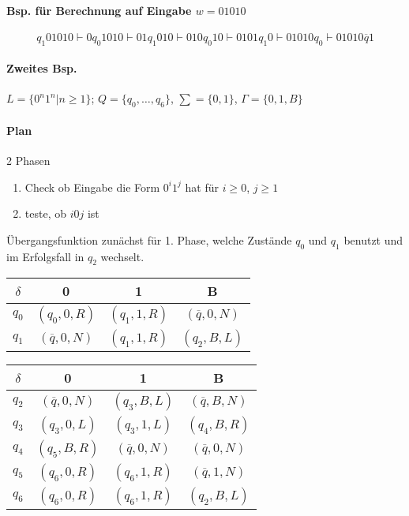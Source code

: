 \paragraph*{Bsp. für Berechnung auf Eingabe $w=01010$} $$q_1 01010 \vdash 0q_0 1010 \vdash 01q_1 010 \vdash 010q_0 10 \vdash 0101q_1 0 \vdash 01010q_0 \vdash 01010\overline{q}1$$

\paragraph*{Zweites Bsp.} $L=\{ 0^n1^n | n \geq 1 \}$; $Q=\{ q_0,\dots,q_6 \}$, $\sum=\{0,1\}$, $\Gamma=\{0,1,B\}$

\paragraph*{Plan} 2 Phasen
\begin{enumerate}
	\item Check ob Eingabe die Form $0^i1^j$ hat für $i \geq 0$, $j \geq 1$
	\item teste, ob $i0j$ ist
\end{enumerate}
Übergangsfunktion zunächst für 1. Phase, welche Zustände $q_0$ und $q_1$ benutzt und im Erfolgsfall in $q_2$ wechselt.

\begin{table}[htb!]
\centering
\begin{tabular}{c|c c c}
$\delta$ & 0 & 1 & B \\
\hline 
$q_0$ & $(q_0,0,R)$ & $(q_1,1,R)$ & $(\overline{q},0,N)$ \\
$q_1$ & $(\overline{q},0,N)$ & $(q_1,1,R)$ & $(q_2,B,L)$ \\
\end{tabular}
\end{table}


\begin{table}[htb!]
\centering
\begin{tabular}{c|c c c}
$\delta$ & 0 & 1 & B \\
\hline
$q_2$ & $(\overline{q},0,N)$ & $(q_3,B,L)$ & $(\overline{q},B,N)$ \\
$q_3$ & $(q_3,0,L)$ & $(q_3,1,L)$ & $(q_4,B,R)$ \\
$q_4$ & $(q_5,B,R)$ & $(\overline{q},0,N)$ & $(\overline{q},0,N)$ \\
$q_5$ & $(q_6,0,R)$ & $(q_6,1,R)$ & $(\overline{q},1,N)$ \\
$q_6$ & $(q_6,0,R)$ & $(q_6,1,R)$ & $(q_2,B,L)$ \\
\end{tabular}
\end{table}

